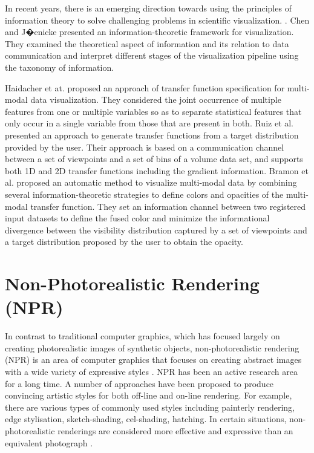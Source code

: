 In recent years, there is an emerging direction towards using the principles of information theory to solve challenging problems in scientific visualization. \cite{wang_information_2011}. Chen and J�enicke \cite{chen_information-theoretic_2010} presented an information-theoretic framework for visualization. They examined the theoretical aspect of information and its relation to data communication and interpret different stages of the visualization pipeline using the taxonomy of information.

Haidacher et at. \cite{haidacher_information-based_2008} proposed an approach of transfer function specification for multi-modal data visualization. They considered the joint occurrence of multiple features from one or multiple variables so as to separate statistical features that only occur in a single variable from those that are present in both.
Ruiz et al. \cite{ruiz_automatic_2011} presented an approach to generate transfer functions from a target distribution provided by the user. Their approach is based on a communication channel between a set of viewpoints and a set of bins of a volume data set, and supports both 1D and 2D transfer functions including the gradient information.
Bramon et al. \cite{bramon_information_2013} proposed an automatic method to visualize multi-modal data by combining several information-theoretic strategies to define colors and opacities of the multi-modal transfer function.
They set an information channel between two registered input datasets to define the fused color and minimize the informational divergence between the visibility distribution captured by a set of viewpoints and a target distribution proposed by the user to obtain the opacity.

\section{Non-Photorealistic Rendering (NPR)}
In contrast to traditional computer graphics, which has focused largely on creating photorealistic images of synthetic objects, non-photorealistic rendering (NPR) is an area of computer graphics that focuses on creating abstract images with a wide variety of expressive styles \cite{haeberli_paint_1990}. NPR has been an active research area for a long time. A number of approaches have been proposed to produce convincing artistic styles for both off-line and on-line rendering. For example, there are various types of commonly used styles including painterly rendering, edge stylisation, sketch-shading, cel-shading, hatching.
In certain situations, non-photorealistic renderings are considered more effective and expressive than an equivalent photograph \cite{healey_perceptually_2004}.

